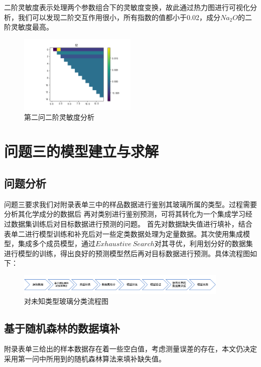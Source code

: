 \documentclass[UTF8]{ctexart}
\begin{document}
二阶灵敏度表示处理两个参数组合下的灵敏度变换，故此通过热力图进行可视化分析，我们可以发现二阶交互作用很小，所有指数的值都小于0.02，成分$Na_2O$的二阶灵敏度最高。

\begin{figure}[H]\centering
    \includegraphics[width=0.5\textwidth,height=0.3\textwidth]{img/S2_heatmap.png} %
    \caption{第二问二阶灵敏度分析} %
    \label{fig:figure 6} %
\end{figure}


\section{问题三的模型建立与求解}
\subsection{问题分析}
问题三要求我们对附录表单三中的样品数据进行鉴别其玻璃所属的类型。过程需要分析其化学成分的数据后
再对类别进行鉴别预测，可将其转化为一个集成学习经过数据集训练后对目标数据进行预测的问题。
首先对数据缺失值进行填补，结合表单二进行模型训练和补充后对一些定类数据处理为定量数据。其次使用集成模型，集成多个成员模型，通过$Exhaustive\ Search$对其寻优，利用划分好的数据集进行模型的训练，得出良好的预测模型然后再对目标数据进行预测。具体流程图如下：


\begin{figure}[H]\centering
    \includegraphics[width=0.9\textwidth]{img/第三问流程图.png} %
    \caption{对未知类型玻璃分类流程图} %
    \label{fig:figure 7} %
\end{figure}

\subsection{基于随机森林的数据填补}
附录表单三给出的样本数据存在着一些空白值，考虑测量误差的存在，本文仍决定采用第一问中所用到的随机森林算法来填补缺失值。
\end{document}
